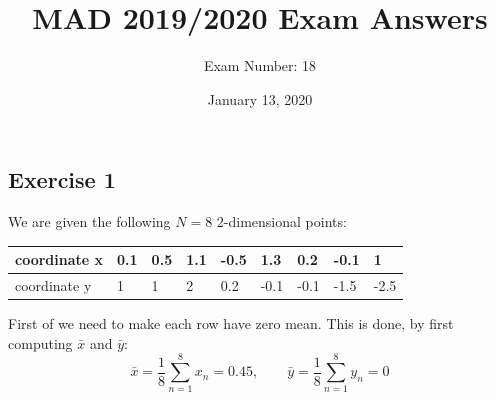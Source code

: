 \documentclass{report}
\title{MAD 2019/2020 Exam Answers}
\author{Exam Number: 18}
\date{January 13, 2020}
\begin{document}
\maketitle

\subsection*{Exercise 1}
We are given the following $N = 8$ 2-dimensional points:
\begin{center}
    \begin{tabular}{|l|l|l|l|l|l|l|l|l|}
        \hline
        coordinate x & 0.1 & 0.5 & 1.1 & -0.5 & 1.3 & 0.2 & -0.1 & 1 \\
        \hline
        coordinate y & 1 & 1 & 2 & 0.2 & -0.1 & -0.1 & -1.5 & -2.5 \\
        \hline
    \end{tabular}
\end{center}
First of we need to make each row have zero mean. This is done, by first computing $\bar{x}$ and $\bar{y}$:
$$\bar{x} = \frac{1}{8} \sum^8 _{n = 1} x_n = 0.45, \quad \quad \bar{y} = \frac{1}{8} \sum^8 _{n = 1} y_n = 0$$
\end{document}
